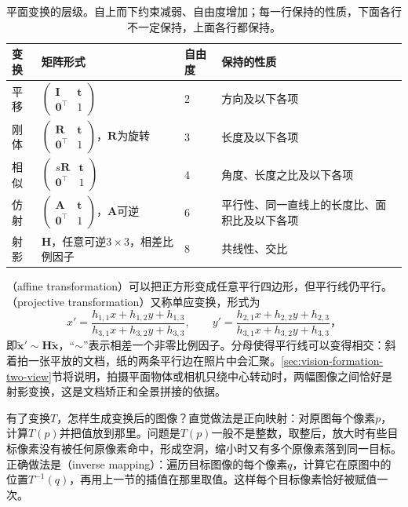 \begin{table}[htbp]
  \centering
  \small
  \begin{tabularx}{\linewidth}{@{}p{16mm}p{40mm}p{10mm}X@{}}
    \toprule
    变换 & 矩阵形式 & 自由度 & 保持的性质\\
    \midrule
    平移 & $\begin{pmatrix}\bm I&\bm t\\\bm0^\top&1\end{pmatrix}$ & 2 & 方向及以下各项\\
    刚体 & $\begin{pmatrix}\bm R&\bm t\\\bm0^\top&1\end{pmatrix}$，$\bm R$为旋转 & 3 & 长度及以下各项\\
    相似 & $\begin{pmatrix}s\bm R&\bm t\\\bm0^\top&1\end{pmatrix}$ & 4 & 角度、长度之比及以下各项\\
    仿射 & $\begin{pmatrix}\bm A&\bm t\\\bm0^\top&1\end{pmatrix}$，$\bm A$可逆 & 6 & 平行性、同一直线上的长度比、面积比及以下各项\\
    射影 & $\bm H$，任意可逆$3\times3$，相差比例因子 & 8 & 共线性、交比\\
    \bottomrule
  \end{tabularx}
  \caption{平面变换的层级。自上而下约束减弱、自由度增加；每一行保持的性质，下面各行不一定保持，上面各行都保持。}
  \label{tab:vision-formation-transform-hierarchy}
\end{table}

（affine transformation）可以把正方形变成任意平行四边形，但平行线仍平行。（projective transformation）又称单应变换，形式为
\begin{equation}
  x'=\frac{h_{1,1}x+h_{1,2}y+h_{1,3}}{h_{3,1}x+h_{3,2}y+h_{3,3}},\qquad
  y'=\frac{h_{2,1}x+h_{2,2}y+h_{2,3}}{h_{3,1}x+h_{3,2}y+h_{3,3}}\text{，}
  \label{eq:vision-formation-homography}
\end{equation}
即$\tilde{\bm x}'\sim\bm H\tilde{\bm x}$，“$\sim$”表示相差一个非零比例因子。分母使得平行线可以变得相交：斜着拍一张平放的文档，纸的两条平行边在照片中会汇聚。\ref{sec:vision-formation-two-view}节将说明，拍摄平面物体或相机只绕中心转动时，两幅图像之间恰好是射影变换，这是文档矫正和全景拼接的依据。

有了变换$T$，怎样生成变换后的图像？直觉做法是正向映射：对原图每个像素$p$，计算$T(p)$并把值放到那里。问题是$T(p)$一般不是整数，取整后，放大时有些目标像素没有被任何原像素命中，形成空洞，缩小时又有多个原像素落到同一目标。正确做法是（inverse mapping）：遍历目标图像的每个像素$q$，计算它在原图中的位置$T^{-1}(q)$，再用上一节的插值在那里取值。这样每个目标像素恰好被赋值一次。

